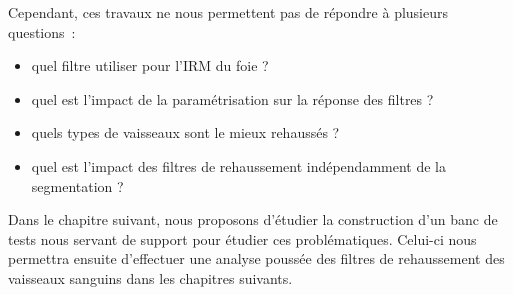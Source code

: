 Cependant, ces travaux ne nous permettent pas de répondre à plusieurs questions~:

\begin{itemize}
\item quel filtre utiliser pour l'IRM du foie ?
\item quel est l'impact de la paramétrisation sur la réponse des filtres ?
\item quels types de vaisseaux sont le mieux rehaussés ?
\item quel est l'impact des filtres de rehaussement indépendamment de la segmentation ?
\end{itemize}

Dans le chapitre suivant, nous proposons d'étudier la construction d'un banc de tests nous servant de support pour étudier ces problématiques. Celui-ci nous permettra ensuite d'effectuer une analyse poussée des filtres de rehaussement des vaisseaux sanguins dans les chapitres suivants.